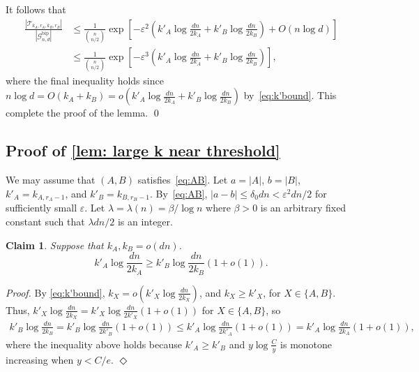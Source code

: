 \documentclass[11pt]{article}
\newenvironment{proofclaim}[1][]%
{\noindent \emph{Proof.} {}{#1}{}}{\hfill
	$\Diamond$\vspace{1em}}
\theoremstyle{plain}
\newtheorem{claim}{Claim}[thm]
\begin{document}
    It follows that
    \begin{align*}
        \frac{|\mathcal T_{k_A, r_A, k_B, r_B}|}{|\mathcal G_{n,d}^{\text{bip}}|}&\leq \frac{1}{\binom{n}{n/2}}\exp\left[-\varepsilon^{2}\left(k'_A\log\frac{dn}{2k_A} + k'_B \log\frac{dn}{2k_B}\right) + O(n\log d)\right]\\
        &\leq \frac{1}{\binom{n}{n/2}}\exp\left[-\varepsilon^{3}\left(k'_A\log\frac{dn}{2k_A} + k'_B \log\frac{dn}{2k_B}\right)\right],
    \end{align*}
    where the final inequality holds since $n\log d = O(k_A + k_B) = o(k'_A\log\frac{dn}{2k_A} + k'_B\log\frac{dn}{2k_B})$ by~\eqref{eq:k'bound}. This complete the proof of the lemma. \qed

\smallskip

\subsection{Proof of \cref{lem: large k near threshold}} \label{sec:large k near threshold}
We may assume that $(A,B)$ satisfies~\eqref{eq:AB}.
    Let $a = |A|$, $b = |B|$, $k'_A = k_{A, r_A - 1}$, and $k'_B = k_{B, r_B- 1}$. By~\eqref{eq:AB}, $|a-b| \leq \delta_0dn < \varepsilon^2dn/2$ for sufficiently small $\varepsilon$. Let $\lambda  = \lambda (n)=\beta/\log n$ where $\beta>0$ is an arbitrary fixed constant such that $\lambda  dn/2$ is an integer.
    \begin{claim}\label{clm: k'Ak'B} Suppose that $k_A,k_B=o(dn)$.
     \[
     k'_A\log\frac{dn}{2k_A} \geq k'_B\log\frac{dn}{2k_B}(1 + o(1)).
     \]
    \end{claim}
    \begin{proofclaim}
       By \eqref{eq:k'bound}, $k_X = o\left(k'_X{\log\frac{dn}{2k_X}}\right)$, and $k_X\ge k'_X$, for $X \in \{A,B\}$. Thus, $k'_X\log\frac{dn}{2k_X} = k'_X\log\frac{dn}{2k'_X}(1 + o(1))$  for $X \in \{A,B\}$, so
    \begin{align}
        k'_B\log\frac{dn}{2k_B} = k'_B\log\frac{dn}{2k'_B}(1 + o(1)) \leq k'_A\log\frac{dn}{2k'_A}(1 + o(1)) = k'_A\log\frac{dn}{2k_A}(1 + o(1)),\nonumber
    \end{align}
    where the inequality above holds because $k'_A \geq k'_B$ and $y\log\frac{C}{y}$ is monotone increasing when $y< C/e$. 
    \end{proofclaim}
    
\end{document}

